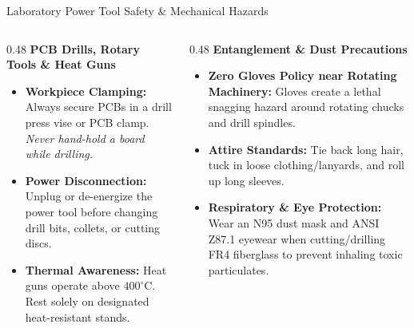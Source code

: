 \begin{frame}{Laboratory Power Tool Safety \& Mechanical Hazards}
    \begin{columns}[T]
        \begin{column}{0.48\textwidth}
            \textbf{PCB Drills, Rotary Tools \& Heat Guns}
            \begin{itemize}
                \item \textbf{Workpiece Clamping:} Always secure PCBs in a drill press vise or PCB clamp. \textit{Never hand-hold a board while drilling.}
                \item \textbf{Power Disconnection:} Unplug or de-energize the power tool before changing drill bits, collets, or cutting discs.
                \item \textbf{Thermal Awareness:} Heat guns operate above $400^\circ\text{C}$. Rest solely on designated heat-resistant stands.
            \end{itemize}
        \end{column}
        \begin{column}{0.48\textwidth}
            \textbf{Entanglement \& Dust Precautions}
            \begin{itemize}
                \item \textbf{Zero Gloves Policy near Rotating Machinery:} Gloves create a lethal snagging hazard around rotating chucks and drill spindles.
                \item \textbf{Attire Standards:} Tie back long hair, tuck in loose clothing/lanyards, and roll up long sleeves.
                \item \textbf{Respiratory \& Eye Protection:} Wear an N95 dust mask and ANSI Z87.1 eyewear when cutting/drilling FR4 fiberglass to prevent inhaling toxic particulates.
            \end{itemize}
        \end{column}
    \end{columns}
\end{frame}

